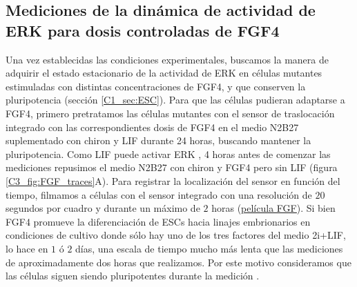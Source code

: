 \documentclass[./main.tex]{subfiles}
\begin{document}
\subsection{Mediciones de la dinámica de actividad de ERK para dosis controladas de FGF4}


Una vez establecidas las condiciones experimentales, buscamos la manera de adquirir el estado estacionario de la actividad de ERK en células mutantes estimuladas con distintas concentraciones de FGF4, y que conserven la pluripotencia (sección \ref{C1_sec:ESC}). Para que las células pudieran adaptarse a FGF4, primero pretratamos las células mutantes con el sensor de traslocación integrado con las correspondientes dosis de FGF4 en el medio N2B27 suplementado con chiron y LIF durante 24 horas, buscando mantener la pluripotencia. Como LIF puede activar ERK \cite{Ohtsuka2015}, 4 horas antes de comenzar las mediciones repusimos el medio N2B27 con chiron y FGF4 pero sin LIF (figura \ref{C3_fig:FGF_traces}A). Para registrar la localización del sensor en función del tiempo, filmamos a células con el sensor integrado con una resolución de $20$ segundos por cuadro y durante un máximo de $2$ horas (\href{http://movie.biologists.com/video/10.1242/dev.199710/video-2}{\underline{película FGF}}). Si bien FGF4 promueve la diferenciación de ESCs hacia linajes embrionarios en condiciones de cultivo donde sólo hay uno de los tres factores del medio 2i+LIF, lo hace en $1$ ó $2$ días, una escala de tiempo mucho más lenta que las mediciones de aproximadamente dos horas que realizamos. Por este motivo consideramos que las células siguen siendo pluripotentes durante la medición \cite{Kalkan2017}. 
\end{document}
